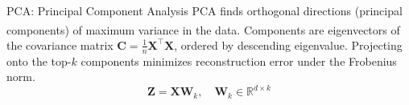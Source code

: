 \begin{v3topic}{PCA: Principal Component Analysis}
    PCA finds orthogonal directions (principal components) of maximum variance in the data\textsuperscript{\cite{hastieElementsStatisticalLearning2008}}.
    Components are eigenvectors of the covariance matrix $\mathbf{C} = \frac{1}{n}\mathbf{X}^\top\mathbf{X}$, ordered by descending eigenvalue.
    Projecting onto the top-$k$ components minimizes reconstruction error under the Frobenius norm.
    \begin{equation}
        \mathbf{Z} = \mathbf{X}\mathbf{W}_k, \quad \mathbf{W}_k \in \mathbb{R}^{d \times k}
    \end{equation}

\end{v3topic}
